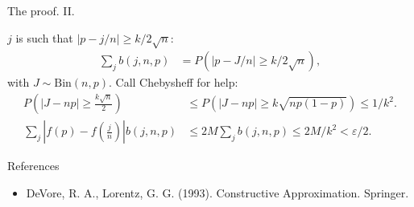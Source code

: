 \begin{frame}
    {The proof. II.}
    
    $j$ is such that $| p - j/n | \geq k/2\sqrt{n}$:
    \begin{align*}
        \sum_{j} b(j,n,p) &= P \left( | p - J/n | \geq k/2\sqrt{n} \right),
    \end{align*}
    with $J \sim \text{Bin}(n,p)$. Call Chebysheff for help: 
    \begin{align*}
        P\left( \left|J - np \right| \geq \frac{k \sqrt{n}}{2} \right) &\leq
        P\left( \left|J - np \right| \geq k\sqrt{n p(1-p)}  \right) \leq 1/k^2. \\
        \sum_{j} \left| f(p)-f\left(\frac{j}{n}\right) \right| b(j,n,p) & \leq 
        2M \sum_{j} b(j,n,p) \leq 2M/k^2 < \varepsilon/2.
    \end{align*}
\end{frame}

\begin{frame}
    {References}

    \begin{itemize}
        \item DeVore, R. A., Lorentz, G. G. (1993). Constructive Approximation. Springer. 
    \end{itemize}


\end{frame}


